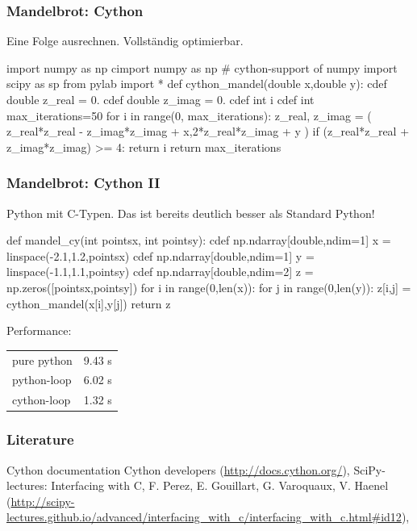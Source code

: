 \documentclass[hyperref={xetex}]{beamer}
\begin{document}
\begin{frame}[fragile]\frametitle{Mandelbrot: Cython}
  Eine Folge ausrechnen. Vollständig optimierbar.
  \begin{pyin}
import numpy as np  
cimport numpy as np #  cython-support of numpy
import scipy as sp  
from pylab import *   
def cython_mandel(double x,double y):
    cdef double z_real = 0.
    cdef double z_imag = 0.
    cdef int i
    cdef int max_iterations=50
    for i in range(0, max_iterations):
        z_real, z_imag = ( z_real*z_real - z_imag*z_imag + x,2*z_real*z_imag + y )
        if (z_real*z_real + z_imag*z_imag) >= 4:
            return i
    return max_iterations    
  \end{pyin}
\end{frame}
 
  \begin{frame}[fragile]\frametitle{Mandelbrot: Cython II}
Python mit C-Typen. Das ist bereits deutlich besser als Standard Python!
    \begin{pyin}
def mandel_cy(int pointsx, int pointsy):
    cdef np.ndarray[double,ndim=1] x = linspace(-2.1,1.2,pointsx)
    cdef np.ndarray[double,ndim=1] y = linspace(-1.1,1.1,pointsy)
    cdef np.ndarray[double,ndim=2] z = np.zeros([pointsx,pointsy])
    for i in range(0,len(x)):
        for j in range(0,len(y)):        
            z[i,j] = cython_mandel(x[i],y[j])
    return z      
    \end{pyin}
    Performance:
    \begin{tabular}[c]{ll}
    pure python & 9.43 s \\
    python-loop & 6.02 s\\
    cython-loop & 1.32 s
  \end{tabular}
\end{frame}
    
\begin{frame}[fragile]\frametitle{Literature}
  \begin{thebibliography}{10}
      \small
     \alert{Cython documentation} Cython developers (\url{http://docs.cython.org/}),
     \alert{SciPy-lectures: Interfacing with C}, F. Perez, E. Gouillart, G. Varoquaux, V. Haenel (\url{http://scipy-lectures.github.io/advanced/interfacing_with_c/interfacing_with_c.html#id12}),
  \end{thebibliography}
  
\end{frame}
\end{document}
